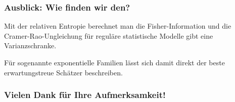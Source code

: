   
      \begin{frame}
    \frametitle{Ausblick: Wie finden wir den?}
    Mit der relativen Entropie berechnet man die Fisher-Information und die Cramer-Rao-Ungleichung für reguläre statistische Modelle gibt eine Varianzschranke.

    Für sogenannte exponentielle Familien lässt sich damit direkt der beste erwartungstreue Schätzer beschreiben.


  \end{frame}

  
\begin{frame}[separator]
  \frametitle{Vielen Dank für Ihre Aufmerksamkeit!}
\end{frame}



